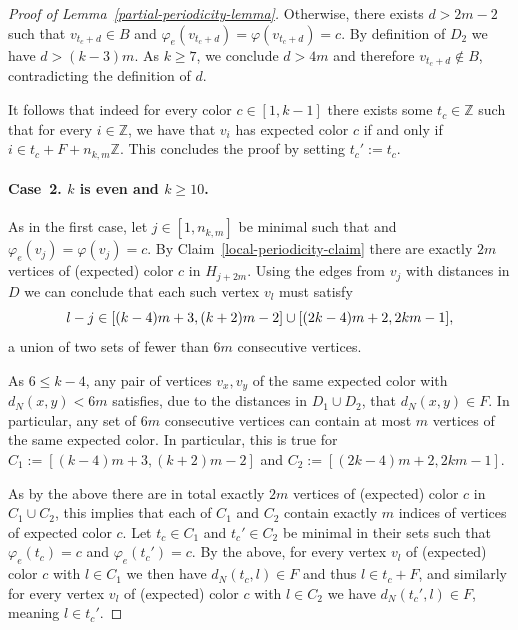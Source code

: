 \documentclass[a4paper,10pt,hidelinks]{amsart}
\renewcommand{\phi}{\ensuremath{\varphi}}
\newenvironment{claimproof}[1][\proofname]{\proof[#1]\renewcommand{\qedsymbol}{$\blacksquare$}}{\endproof}
\theoremstyle{definition}
\begin{document}
\begin{proof}[Proof of Lemma~\ref{partial-periodicity-lemma}]
\begin{claimproof}[Proof of Claim~\ref{equiv-structure}]
        Otherwise, there exists $d > 2m - 2$ such that $v_{t_c + d} \in B$ and $\varphi_e(v_{t_c + d})=\phi(v_{t_c + d}) = c$. By definition of $D_2$ we have $d > (k - 3)m$. As $k \geq 7$, we conclude $d > 4m$ and therefore $v_{t_c + d} \notin B$, contradicting the definition of $d$. 
        
        It follows that indeed for every color $c\in [1,k-1]$ there exists some $t_c\in \mathbb{Z}$ such that for every $i\in \mathbb{Z}$, we have that $v_i$ has expected color $c$ if and only if $i \in t_c + F + n_{k,m}\mathbb{Z}$. This concludes the proof by setting $t_c':=t_c$.

        \medskip

        \paragraph*{\textbf{Case~2.} $k$ is even and $k \geq 10$.} 
        As in the first case, let $j \in [1, n_{k,m}]$ be minimal such that and $\varphi_e(v_j)=\phi(v_j)=c$. By Claim~\ref{local-periodicity-claim} there are exactly $2m$ vertices of (expected) color $c$ in $H_{j + 2m}$. 
        Using the edges from $v_j$ with distances in $D$ we can conclude that each such vertex $v_l$ must satisfy
        \begin{equation}\notag
            l - j \in [(k-4)m + 3, (k+2)m - 2] \cup [(2k - 4)m + 2, 2km - 1],
        \end{equation}
        a union of two sets of fewer than $6m$ consecutive vertices. 

        As $6 \leq k - 4$, any pair of vertices $v_x, v_y$ of the same expected color with $d_N(x, y) < 6m$ satisfies, due to the distances in $D_1 \cup D_2$, that $d_N(x, y) \in F$. In particular, any set of $6m$ consecutive vertices can contain at most $m$ vertices of the same expected color. In particular, this is true for $C_1 := [(k-4)m + 3, (k+2)m - 2]$ and $C_2 := [(2k - 4)m + 2, 2km - 1]$.

        As by the above there are in total exactly $2m$ vertices of (expected) color $c$ in $C_1\cup C_2$, this implies that each of $C_1$ and $C_2$ contain exactly $m$ indices of vertices of expected color $c$. Let $t_c \in C_1$ and $t_c' \in C_2$ be minimal in their sets such that $\varphi_e(t_c) = c$ and $\varphi_e(t_c') = c$. By the above, for every vertex $v_l$ of (expected) color $c$ with $l\in C_1$ we then have $d_N(t_c,l)\in F$ and thus $l\in t_c+F$, and similarly for every vertex $v_l$ of (expected) color $c$ with $l\in C_2$ we have $d_N(t_{c}',l)\in F$, meaning $l\in t_c'$. 


\end{claimproof}
\end{proof}
\end{document}
